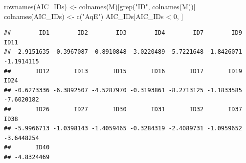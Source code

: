 \documentclass[
  ignorenonframetext,
]{beamer}
\newenvironment{Shaded}{\begin{snugshade}}{\end{snugshade}}
\newcommand{\DecValTok}[1]{\textcolor[rgb]{0.00,0.00,0.81}{#1}}
\newcommand{\FunctionTok}[1]{\textcolor[rgb]{0.00,0.00,0.00}{#1}}
\newcommand{\NormalTok}[1]{#1}
\newcommand{\OtherTok}[1]{\textcolor[rgb]{0.56,0.35,0.01}{#1}}
\newcommand{\SpecialCharTok}[1]{\textcolor[rgb]{0.00,0.00,0.00}{#1}}
\newcommand{\StringTok}[1]{\textcolor[rgb]{0.31,0.60,0.02}{#1}}
\begin{document}
\begin{frame}[fragile]{}
\protect\hypertarget{section-20}{}
\tiny

\begin{Shaded}
\begin{Highlighting}[]
\FunctionTok{rownames}\NormalTok{(AIC\_IDs) }\OtherTok{\textless{}{-}} \FunctionTok{colnames}\NormalTok{(M)[}\FunctionTok{grep}\NormalTok{(}\StringTok{"ID"}\NormalTok{, }\FunctionTok{colnames}\NormalTok{(M))]}
\FunctionTok{colnames}\NormalTok{(AIC\_IDs) }\OtherTok{\textless{}{-}} \FunctionTok{c}\NormalTok{(}\StringTok{"AqE"}\NormalTok{)}
\NormalTok{AIC\_IDs[AIC\_IDs }\SpecialCharTok{\textless{}} \DecValTok{0}\NormalTok{, ]}
\end{Highlighting}
\end{Shaded}

\begin{verbatim}
##        ID1        ID2        ID3        ID4        ID7        ID9       ID11 
## -2.9151635 -0.3967087 -0.8910848 -3.0220489 -5.7221648 -1.8426071 -1.1914115 
##       ID12       ID13       ID15       ID16       ID17       ID19       ID24 
## -0.6273336 -6.3892507 -4.5287970 -0.3193861 -8.2713125 -1.1833585 -7.6020182 
##       ID26       ID27       ID30       ID31       ID32       ID37       ID38 
## -5.9966713 -1.0398143 -1.4059465 -0.3284319 -2.4089731 -1.0959652 -3.6448254 
##       ID40 
## -4.8324469
\end{verbatim}
\end{frame}
\end{document}
